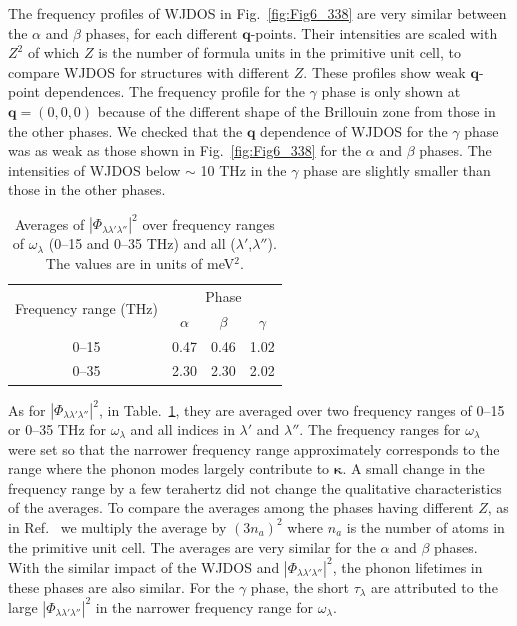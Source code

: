 \documentclass[twocolumn,amsmath,amssymb,a4paper,prb,superscriptaddress,floatfix]{revtex4-1}
\begin{document}
The frequency profiles of WJDOS in Fig.~\ref{fig:Fig6_338} are very similar between the $\alpha$ and
$\beta$ phases, for each different $\mathbf{q}$-points.  Their intensities are
scaled with $Z^2$ of which $Z$ is the number of formula units in the primitive
unit cell, to compare WJDOS for structures with different $Z$.  These profiles
show weak $\mathbf{q}$-point dependences.  The frequency profile for the
$\gamma$ phase is only shown at $\mathbf{q}=(0,0,0)$ because of the different
shape of the Brillouin zone from those in the other phases.  We checked that
the $\mathbf{q}$ dependence of WJDOS for the $\gamma$ phase was as weak as
those shown in Fig.~\ref{fig:Fig6_338} for the $\alpha$ and $\beta$ phases.
The intensities of WJDOS below $\sim$ 10 THz in the $\gamma$ phase are slightly smaller than those in
the other phases.


\begin{table}[ht]
 \caption{\label{table:aveavepp} Averages of
 $|\Phi_{\lambda\lambda'\lambda''}|^2$ over frequency ranges of
 $\omega_\lambda$ (0--15 and 0--35 THz) and all ($\lambda'$,$\lambda''$). The
 values are in units of meV$^2$.}
 \begin{ruledtabular}
  \begin{tabular}{cccc}
   \multirow{2}{*}{Frequency range (THz)}
   & \multicolumn{3}{c}{Phase}  \\
   \cline{2-4} & $\alpha$ & $\beta$ & $\gamma$ \\
   \hline
   \multirow{1}{*}{0--15} & 0.47 & 0.46 & 1.02 \\
   \multirow{1}{*}{0--35} & 2.30 & 2.30 & 2.02
  \end{tabular}
 \end{ruledtabular}
\end{table}

As for $|\Phi_{\lambda\lambda'\lambda''}|^2$, in Table.~\ref{table:aveavepp},
they are averaged over two frequency ranges of 0--15 or 0--35 THz for
$\omega_\lambda$ and all indices in $\lambda'$ and $\lambda''$.  The frequency
ranges for $\omega_\lambda$ were set so that the narrower frequency range
approximately corresponds to the range where the phonon modes largely contribute
to $\boldsymbol{\kappa}$. A small change in the frequency range by a few
terahertz did not change the qualitative characteristics of the averages.  To
compare the averages among the phases having different $Z$, as in
Ref.~ we multiply the average by $(3n_a)^2$ where $n_a$ is the
number of atoms in the primitive unit cell. The averages are very similar for
the $\alpha$ and $\beta$ phases. With the similar impact of the WJDOS and
$|\Phi_{\lambda\lambda'\lambda''}|^2$, the phonon lifetimes in these phases are
also similar. For the $\gamma$ phase, the short $\tau_\lambda$ are attributed to
the large $|\Phi_{\lambda\lambda'\lambda''}|^2$ in the narrower frequency range
for $\omega_\lambda$.
\end{document}
